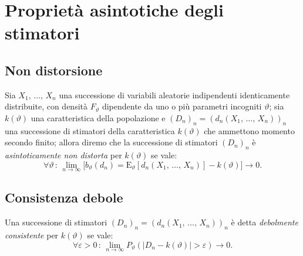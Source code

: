     \section{Proprietà asintotiche degli stimatori}
        \subsection{Non distorsione}
            \begin{defn}
                Sia $X_1,\, \ldots,\, X_{n}$ una successione di variabili aleatorie indipendenti 
                identicamente distribuite, con densità $F_{\vartheta}$ dipendente da uno o 
                più parametri incogniti $\vartheta$; sia $k(\vartheta)$ una caratteristica 
                della popolazione e $(D_n)_n = (d_n(X_1,\, \ldots,\, X_{n}))_n$ una successione 
                di stimatori  della caratteristica $k(\vartheta)$ che ammettono momento secondo finito;
                allora diremo che la successione di stimatori $(D_n)_n$ è
                \emph{asintoticamente non distorta} per $k(\vartheta)$ se vale: \[
                    \forall \vartheta \,:\, \lim_{n \to \infty} \big[ b_{\vartheta}(d_n) =
                    \text{E}_{\vartheta}[d_n(X_1,\, \ldots,\, X_{n})] - k(\vartheta) \big] \rightarrow 0
                .\]
            \end{defn}
        \subsection{Consistenza debole}
            \begin{defn}
                Una successione di stimatori $(D_n)_n = (d_n(X_1,\, \ldots,\, X_{n}))_n$ è detta \emph{debolmente consistente} per $k(\vartheta)$ se vale: \[
                    \forall \varepsilon > 0 \,:\, \lim_{n \to \infty} 
                    P_{\vartheta}(|D_n - k(\vartheta)| > \varepsilon) \rightarrow 0
                .\] 
            \end{defn}
